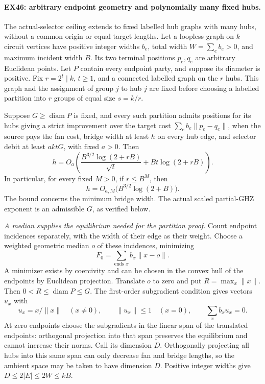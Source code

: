 \paragraph{EX46: arbitrary endpoint geometry and polynomially many fixed hubs.}
The actual-selector ceiling extends to fixed labelled hub graphs with
many hubs, without a common origin or equal target lengths. Let a
loopless graph on $k$ circuit vertices have positive integer widths
$b_e$, total width $W=\sum_e b_e>0$, and maximum incident width $B$.
Its two terminal positions $p_e,q_e$ are arbitrary Euclidean points.
Let $P$ contain every endpoint party, and suppose its diameter is
positive. Fix $r=2^t\mid k$, $t\ge1$, and a connected labelled graph
on the $r$ hubs. This graph and the assignment of group $j$ to hub
$j$ are fixed before choosing a labelled partition into $r$ groups
of equal size $s=k/r$.

Suppose $G\ge\operatorname{diam}P$ is fixed, and every such partition
admits positions for its hubs giving a strict improvement over the
target cost $\sum_e b_e\|p_e-q_e\|$, when the source pays the fan cost,
bridge width at least $h$ on every hub edge, and selector debit at
least $aktG$, with fixed $a>0$. Then
\[
 h=O_a\!\left(
       \frac{B^{3/2}\log(2+rB)}{\sqrt t}
                +Bt\log(2+rB)\right).
 \tag{EX46.1}
\]
In particular, for every fixed $M>0$, if $r\le B^M$, then
\[
                     h=O_{a,M}\bigl(B^{3/2}\log(2+B)\bigr).
 \tag{EX46.2}
\]
The bound concerns the minimum bridge width. The actual scaled
partial-GHZ exponent is an admissible $G$, as verified below.

\emph{A median supplies the equilibrium needed for the partition proof.}
Count endpoint incidences separately, with the width of their edge
as their weight. Choose a weighted geometric median $o$ of these
incidences, minimizing
\[
                         F_0=\sum_{\text{ends }x}b_x\|x-o\|.
\]
A minimizer exists by coercivity and can be chosen in the convex hull
of the endpoints by Euclidean projection. Translate $o$ to zero and
put $R=\max_x\|x\|$. Then
$0<R\le\operatorname{diam}P\le G$. The first-order subgradient
condition gives vectors $u_x$ with
\[
 u_x=x/\|x\|\quad(x\ne0),\qquad
 \|u_x\|\le1\quad(x=0),\qquad
                         \sum_xb_xu_x=0.
 \tag{EX46.3}
\]
At zero endpoints choose the subgradients in the linear span of the
translated endpoints: orthogonal projection into that span preserves
the equilibrium and cannot increase their norms. Call its dimension
$D$. Orthogonally projecting all hubs into this same span can only
decrease fan and bridge lengths, so the ambient space may be taken
to have dimension $D$. Positive integer widths give
$D\le2|E|\le2W\le kB$.

